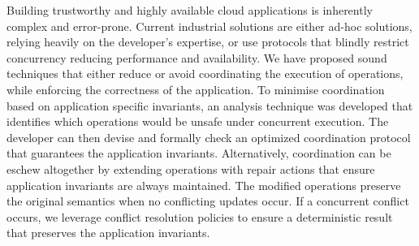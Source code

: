Building trustworthy and highly available cloud applications is inherently complex and error-prone. Current industrial solutions are either ad-hoc solutions, relying heavily on the developer’s expertise, or use protocols that blindly restrict concurrency reducing performance and availability. We have proposed sound techniques that either reduce or avoid coordinating the execution of operations, while enforcing the correctness of the application. To minimise coordination based on application specific invariants, an analysis technique was developed that identifies which operations would be unsafe under concurrent execution. The developer can then devise and formally check an optimized coordination protocol that guarantees the application invariants. Alternatively, coordination can be eschew altogether by extending operations with repair actions that ensure application invariants are always maintained. The modified operations preserve the original semantics when no conflicting updates occur. If a concurrent conflict occurs, we leverage conflict resolution policies to ensure a deterministic result that preserves the application invariants.